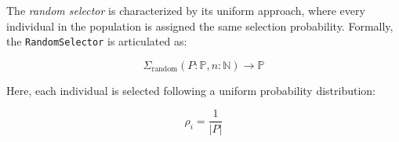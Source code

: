 \begin{definition}
  \label{def:keen:operators:selection:random}
    The \emph{random selector} is characterized by its uniform approach, where every individual in the population is 
    assigned the same selection probability. Formally, the \texttt{RandomSelector} is articulated as:
    
    \begin{equation}
      \Sigma_{\mathrm{random}}(P: \mathbb{P}, n: \mathbb{N}) \to \mathbb{P}
    \end{equation}
    
    Here, each individual is selected following a uniform probability distribution:
    
    \begin{equation}
      \rho_i = \frac{1}{|P|}
    \end{equation}
  \end{definition}
  